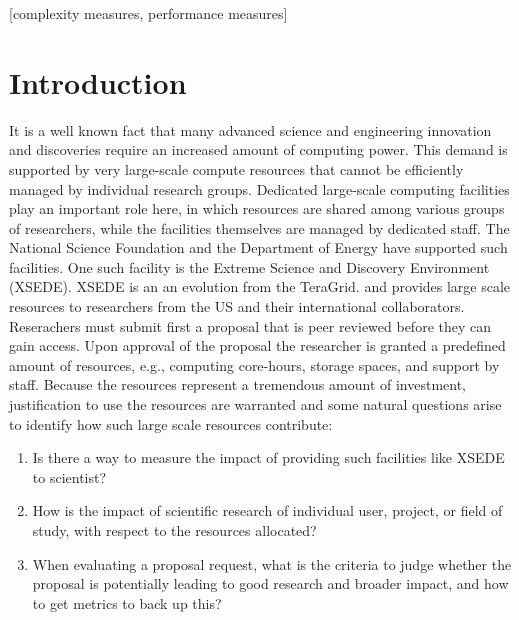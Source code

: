 \documentclass{sig-alternate}
\begin{document}
[complexity measures, performance measures] 
 
 
 
 
\section{Introduction} 
 
It is a well known fact that many advanced science and engineering innovation and discoveries  require an increased amount of computing power. This demand is supported by  very large-scale compute resources that cannot be efficiently managed by individual research groups. Dedicated large-scale computing facilities play an important role here, in which resources are shared among various groups of researchers, while the facilities themselves are managed by dedicated staff. The National Science Foundation and the Department of Energy have supported such facilities. One such facility is the Extreme Science and Discovery Environment (XSEDE). XSEDE is an an evolution from the TeraGrid. \cite{www-xsede}and provides large scale resources to researchers from the US and their international collaborators. Reserachers must submit first a proposal that is peer reviewed before they can gain access. Upon approval of the proposal the researcher is granted a predefined amount of resources, e.g., computing core-hours, storage spaces, and support by staff. Because the resources represent a tremendous amount of investment, justification to use the resources are warranted and some natural questions arise to identify how such large scale resources contribute:
 
\begin{enumerate} 
\item Is there a way to measure the impact of providing such facilities like XSEDE to scientist?  
 
\item How is the impact of scientific research of individual user, project, or field of study, with respect to the resources allocated?  
 
\item When evaluating a proposal request, what is the criteria to judge whether the proposal is potentially leading to good research and broader impact, and how to get metrics to back up this? 
\end{enumerate} 
 
\end{document}
